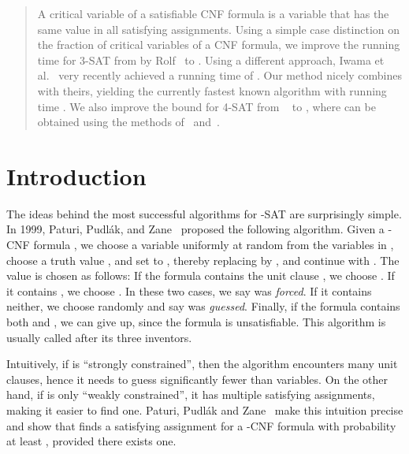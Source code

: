 
\begin{abstract}
  A critical variable of a satisfiable CNF formula is a variable that has the
  same value in all satisfying assignments.  Using a simple case
  distinction on the fraction of critical variables of a CNF formula, we
  improve the running time for
  3-SAT from  by Rolf~\cite{rolf2006}
  to .
  Using a different approach, Iwama et al.~\cite{istt10} very recently achieved a running time of .
  Our method nicely combines with theirs, yielding the currently fastest known algorithm with running time
  .
  We also improve the
  bound for 4-SAT from
  ~\cite{it04} to
  , where
   can be obtained using the
  methods of~\cite{it04} and~\cite{rolf2006}.
\end{abstract}

\section{Introduction}

The ideas behind the most successful algorithms for -SAT are
surprisingly simple.  In 1999, Paturi, Pudl\'ak, and Zane~\cite{ppz}
proposed the following algorithm.  Given a -CNF formula , we
choose a variable  uniformly at random from the  variables in
, choose a truth value , and set  to , thereby
replacing  by , and continue with .  The value  is chosen as follows: If the formula contains
the unit clause , we choose . If it contains , we
choose .  In these two cases, we say  was {\em forced}. If it
contains neither, we choose  randomly and say  was {\em
  guessed}.  Finally, if the formula contains both  and
, we can give up, since the formula is unsatisfiable. This
algorithm is usually called  after its three inventors.

Intuitively, if  is ``strongly constrained'', then the algorithm
encounters many unit clauses, hence it needs to guess significantly
fewer than  variables. On the other hand, if   is only
``weakly constrained'', it has multiple satisfying assignments,
making it easier to find one.
Paturi, Pudl\'ak and Zane~\cite{ppz} make this intuition precise and
show that  finds a satisfying assignment for a -CNF formula with probability at
least , provided there exists one.

